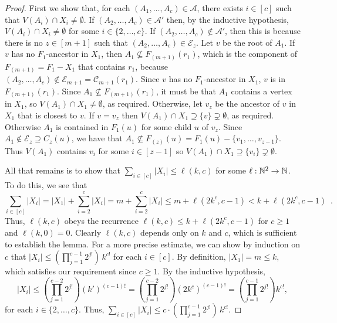 \documentclass{patmorin}
\begin{document}
\begin{proof}
  First we show that, for each $(A_1,\ldots,A_c)\in\mathcal{A}$, there exists $i\in[c]$ such that $V(A_i)\cap X_i\neq\emptyset$.  If $(A_2,\ldots,A_c)\in \mathcal{A}'$ then, by the inductive hypothesis, $V(A_i)\cap X_i\neq\emptyset$ for some $i\in\{2,\ldots,c\}$.  If $(A_2,\ldots,A_c)\notin\mathcal{A}'$, then this is because there is no $z\in[m+1]$ such that $(A_2,\ldots,A_c)\in\mathcal{E}_{z}$. Let $v$ be the root of $A_1$.    If $v$ has no $F_1$-ancestor in $X_1$, then
  $A_1\not\subseteq F_{(m+1)}(r_1)$, which is the component of $F_{(m+1)}=F_1-X_1$ that contains $r_1$, because $(A_2, \dots, A_c)\notin\mathcal{E}_{m+1}=\mathcal{C}_{m+1}(r_1)$.
  Since $v$ has no $F_1$-ancestor in $X_1$, $v$ is in $F_{(m+1)}(r_1)$. Since $A_1\not\subseteq F_{(m+1)}(r_1)$, it must be that $A_1$ contains a vertex in $X_1$, so $V(A_1)\cap X_1\neq\emptyset$, as required.  Otherwise, let $v_z$ be the ancestor of $v$ in $X_1$ that is closest to $v$.  If $v=v_z$ then $V(A_1)\cap X_1\supseteq\{v\}\supsetneq\emptyset$, as required.  Otherwise $A_1$ is contained in $F_1(u)$ for some child $u$ of $v_z$.  Since $A_1\notin\mathcal{E}_{z}\supseteq C_{z}(u)$, we have that $A_1\not\subseteq F_{(z)}(u)=F_1(u)-\{v_1,\ldots,v_{z-1}\}$.  Thus $V(A_1)$ contains $v_i$ for some $i\in[z-1]$ so $V(A_1)\cap X_1\supseteq\{v_i\}\supsetneq\emptyset$.

  All that remains is to show that $\sum_{i\in[c]}|X_i|\le\ell(k,c)$ for some $\ell:\mathbb{N}^2\to\mathbb{N}$.  To do this, we see that
  \[
    \sum_{i\in[c]} |X_i| = |X_1| + \sum_{i=2}^{c}|X_i|
      = m + \sum_{i=2}^{c}|X_i|
      \le m + \ell(2k^c,c-1)
      < k + \ell(2k^c,c-1) \enspace .
  \]
  Thus, $\ell(k,c)$ obeys the recurrence $\ell(k,c)\le k + \ell(2k^c,c-1)$ for $c\ge 1$ and $\ell(k,0)=0$.  Clearly $\ell(k,c)$ depends only on $k$ and $c$, which is sufficient to establish the lemma.  For a more precise estimate, we can show by induction on $c$ that $|X_i|\le (\prod_{j=1}^{c-1}2^{j!})\, k^{c!}$ for each $i\in[c]$. By definition, $|X_1|=m\le k$, which satisfies our requirement since $c\ge 1$.  By the inductive hypothesis,
  \[\textstyle
    |X_i|
     \le \left(\prod_{j=1}^{c-2}2^{j!}\right)(k')^{(c-1)!}
     = \left(\prod_{j=1}^{c-2}2^{j!}\right)(2k^c)^{(c-1)!}
     = \left(\prod_{j=1}^{c-1}2^{j!}\right)k^{c!} ,
  \]
  for each $i\in\{2,\ldots,c\}$.  Thus, $\sum_{i\in[c]}|X_i|\le c\cdot (\prod_{j=1}^{c-1}2^{j!})\, k^{c!}$.
\end{proof}
\end{document}
